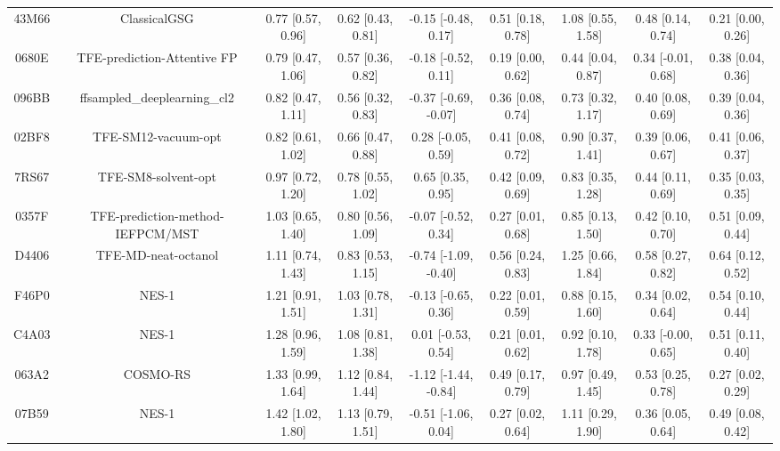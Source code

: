 \documentclass{article}
\begin{document}
\begin{center}
\begin{longtable}{|ccccccccc|}
 43M66 &                            ClassicalGSG &  0.77 [0.57, 0.96] &  0.62 [0.43, 0.81] &   -0.15 [-0.48, 0.17] &  0.51 [0.18, 0.78] &     1.08 [0.55, 1.58] &     0.48 [0.14, 0.74] &     0.21 [0.00, 0.26] \\
 0680E &             TFE-prediction-Attentive FP &  0.79 [0.47, 1.06] &  0.57 [0.36, 0.82] &   -0.18 [-0.52, 0.11] &  0.19 [0.00, 0.62] &     0.44 [0.04, 0.87] &    0.34 [-0.01, 0.68] &     0.38 [0.04, 0.36] \\
 096BB &            ffsampled\_deeplearning\_cl2 &  0.82 [0.47, 1.11] &  0.56 [0.32, 0.83] &  -0.37 [-0.69, -0.07] &  0.36 [0.08, 0.74] &     0.73 [0.32, 1.17] &     0.40 [0.08, 0.69] &     0.39 [0.04, 0.36] \\
 02BF8 &                     TFE-SM12-vacuum-opt &  0.82 [0.61, 1.02] &  0.66 [0.47, 0.88] &    0.28 [-0.05, 0.59] &  0.41 [0.08, 0.72] &     0.90 [0.37, 1.41] &     0.39 [0.06, 0.67] &     0.41 [0.06, 0.37] \\
 7RS67 &                     TFE-SM8-solvent-opt &  0.97 [0.72, 1.20] &  0.78 [0.55, 1.02] &     0.65 [0.35, 0.95] &  0.42 [0.09, 0.69] &     0.83 [0.35, 1.28] &     0.44 [0.11, 0.69] &     0.35 [0.03, 0.35] \\
 0357F &        TFE-prediction-method-IEFPCM/MST &  1.03 [0.65, 1.40] &  0.80 [0.56, 1.09] &   -0.07 [-0.52, 0.34] &  0.27 [0.01, 0.68] &     0.85 [0.13, 1.50] &     0.42 [0.10, 0.70] &     0.51 [0.09, 0.44] \\
 D4406 &                     TFE-MD-neat-octanol &  1.11 [0.74, 1.43] &  0.83 [0.53, 1.15] &  -0.74 [-1.09, -0.40] &  0.56 [0.24, 0.83] &     1.25 [0.66, 1.84] &     0.58 [0.27, 0.82] &     0.64 [0.12, 0.52] \\
 F46P0 &                                   NES-1 &  1.21 [0.91, 1.51] &  1.03 [0.78, 1.31] &   -0.13 [-0.65, 0.36] &  0.22 [0.01, 0.59] &     0.88 [0.15, 1.60] &     0.34 [0.02, 0.64] &     0.54 [0.10, 0.44] \\
 C4A03 &                                   NES-1 &  1.28 [0.96, 1.59] &  1.08 [0.81, 1.38] &    0.01 [-0.53, 0.54] &  0.21 [0.01, 0.62] &     0.92 [0.10, 1.78] &    0.33 [-0.00, 0.65] &     0.51 [0.11, 0.40] \\
 063A2 &                                COSMO-RS &  1.33 [0.99, 1.64] &  1.12 [0.84, 1.44] &  -1.12 [-1.44, -0.84] &  0.49 [0.17, 0.79] &     0.97 [0.49, 1.45] &     0.53 [0.25, 0.78] &     0.27 [0.02, 0.29] \\
 07B59 &                                   NES-1 &  1.42 [1.02, 1.80] &  1.13 [0.79, 1.51] &   -0.51 [-1.06, 0.04] &  0.27 [0.02, 0.64] &     1.11 [0.29, 1.90] &     0.36 [0.05, 0.64] &     0.49 [0.08, 0.42] \\

\end{longtable}
\end{center}
\end{document}
